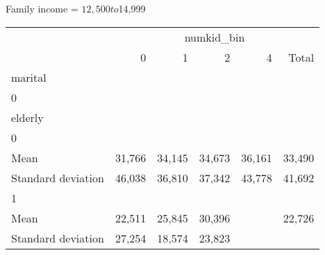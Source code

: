 Family income = $12,500 to $14,999
\begin{tabular}{llllll}
\cline{1-6}
\multicolumn{1}{c}{} &
  \multicolumn{5}{|c}{numkid\_bin} \\
\multicolumn{1}{c}{} &
  \multicolumn{1}{|r}{0} &
  \multicolumn{1}{r}{1} &
  \multicolumn{1}{r}{2} &
  \multicolumn{1}{r}{4} &
  \multicolumn{1}{r}{Total} \\
\cline{1-6}
\multicolumn{1}{l}{marital} &
  \multicolumn{1}{|r}{} &
  \multicolumn{1}{r}{} &
  \multicolumn{1}{r}{} &
  \multicolumn{1}{r}{} &
  \multicolumn{1}{r}{} \\
\multicolumn{1}{l}{\hspace{1em}0} &
  \multicolumn{1}{|r}{} &
  \multicolumn{1}{r}{} &
  \multicolumn{1}{r}{} &
  \multicolumn{1}{r}{} &
  \multicolumn{1}{r}{} \\
\multicolumn{1}{l}{\hspace{2em}elderly} &
  \multicolumn{1}{|r}{} &
  \multicolumn{1}{r}{} &
  \multicolumn{1}{r}{} &
  \multicolumn{1}{r}{} &
  \multicolumn{1}{r}{} \\
\multicolumn{1}{l}{\hspace{3em}0} &
  \multicolumn{1}{|r}{} &
  \multicolumn{1}{r}{} &
  \multicolumn{1}{r}{} &
  \multicolumn{1}{r}{} &
  \multicolumn{1}{r}{} \\
\multicolumn{1}{l}{\hspace{4em}Mean} &
  \multicolumn{1}{|r}{31,766} &
  \multicolumn{1}{r}{34,145} &
  \multicolumn{1}{r}{34,673} &
  \multicolumn{1}{r}{36,161} &
  \multicolumn{1}{r}{33,490} \\
\multicolumn{1}{l}{\hspace{4em}Standard deviation} &
  \multicolumn{1}{|r}{46,038} &
  \multicolumn{1}{r}{36,810} &
  \multicolumn{1}{r}{37,342} &
  \multicolumn{1}{r}{43,778} &
  \multicolumn{1}{r}{41,692} \\
\multicolumn{1}{l}{\hspace{3em}1} &
  \multicolumn{1}{|r}{} &
  \multicolumn{1}{r}{} &
  \multicolumn{1}{r}{} &
  \multicolumn{1}{r}{} &
  \multicolumn{1}{r}{} \\
\multicolumn{1}{l}{\hspace{4em}Mean} &
  \multicolumn{1}{|r}{22,511} &
  \multicolumn{1}{r}{25,845} &
  \multicolumn{1}{r}{30,396} &
  \multicolumn{1}{r}{} &
  \multicolumn{1}{r}{22,726} \\
\multicolumn{1}{l}{\hspace{4em}Standard deviation} &
  \multicolumn{1}{|r}{27,254} &
  \multicolumn{1}{r}{18,574} &
  \multicolumn{1}{r}{23,823} &

\end{tabular}
